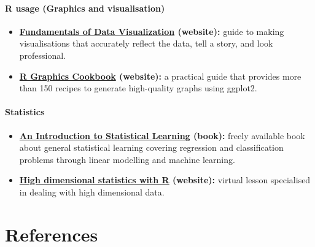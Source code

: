 \documentclass[
]{book}
\providecommand{\tightlist}{%
  \setlength{\itemsep}{0pt}\setlength{\parskip}{0pt}}
\begin{document}
\hypertarget{r-usage-graphics-and-visualisation}{%
\subsubsection*{R usage (Graphics and visualisation)}\label{r-usage-graphics-and-visualisation}}

\begin{itemize}
\tightlist
\item
  \textbf{\href{https://clauswilke.com/dataviz/}{Fundamentals of Data Visualization} (website):} guide to making visualisations that accurately reflect the data, tell a story, and look professional.
\item
  \textbf{\href{https://r-graphics.org/index.html}{R Graphics Cookbook} (website):} a practical guide that provides more than 150 recipes to generate high-quality graphs using ggplot2.
\end{itemize}

\hypertarget{statistics}{%
\subsubsection*{Statistics}\label{statistics}}

\begin{itemize}
\tightlist
\item
  \textbf{\href{https://www.statlearning.com/}{An Introduction to Statistical Learning} (book):} freely available book about general statistical learning covering regression and classification problems through linear modelling and machine learning.
\item
  \textbf{\href{https://carpentries-incubator.github.io/high-dimensional-stats-r/}{High dimensional statistics with R} (website):} virtual lesson specialised in dealing with high dimensional data.
\end{itemize}

\hypertarget{references}{%
\chapter{References}\label{references}}

  
\end{document}
